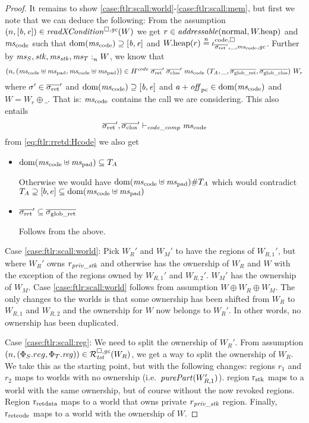 \begin{proof}
  It remains to show \ref{case:ftlr:scall:world}-\ref{case:ftlr:scall:mem}, but first we note that we can deduce the following: From the assumption $\npair{[\baddr,\eaddr]} \in \xReadCond{W}$ we get $r \in \addressable{\normal, \pwheap}$ and $\mscode$ such that $\dom(\mscode) \supseteq [\baddr,\eaddr]$ and $\pwheap(r) \nequal \codereg{\sigrets',\_,\mscode,\gc}$.
  Further by $\mathit{ms}_S,\mathit{stk},\mathit{ms}_{\mathit{stk}},\mathit{ms}_T :_{n}^{}W$, we know that
  \begin{equation}
    \npair{(\mscode\uplus\mspad,\mscode\uplus\mspad)} \in H^{\var{code}} \; \sigrets' \; \sigcloss' \; \mscode \; (\ta,\_,\gsigrets,\gsigcloss)~ W_r\label{eq:ftlr:rretd:Hcode}
  \end{equation}
  where $\sigma' \in \sigrets'$ and $\dom(\mscode) \supseteq [\baddr,\eaddr]$ and $\aaddr + \offpc \in \dom(\mscode)$ and $W = W_r \oplus \_$.
  That is: $\mscode$ contains the call we are considering.
  This also entails
  \begin{equation}
    \label{eq:ftlr:code-comp-jud}
    \sigrets',\sigcloss' \vdash_\var{code\_comp} \mscode
  \end{equation}
  from \ref{eq:ftlr:rretd:Hcode} we also get
\begin{itemize}
\item $\dom(\mscode\uplus\mspad) \subseteq \ta$

  Otherwise we would have $\dom(\mscode\uplus\mspad) \# \ta$ which would contradict $\ta\supseteq [b,e] \subseteq\dom(\mscode\uplus\mspad)$

\item $\sigrets' \subseteq \gsigrets$

  Follows from the above.
\end{itemize}


  Case \ref{case:ftlr:scall:world}: Pick $W_R'$ and $W_M'$ to have the regions of $W_{R,1}'$, but where $W_R'$ owns $r_{\mathit{priv\_stk}}$ and otherwise has the ownership of $W_R$ and $W$ with the exception of the regions owned by $W_{R,1}'$ and $W_{R,2}'$.
  $W_M'$ has the ownership of $W_M$.
  Case \ref{case:ftlr:scall:world} follows from assumption $W \oplus W_R \oplus W_M$.
  The only changes to the worlds is that some ownership has been shifted from $W_R$ to $W_{R,1}$ and $W_{R,2}$ and the ownership for $W$ now belongs to $W_R'$.
  In other words, no ownership has been duplicated.

  Case \ref{case:ftlr:scall:reg}: We need to split the ownership of $W_R'$.
  From assumption $\npair[n]{(\Phi_S.reg,\Phi_T.\reg)} \in \lrrg{\trust}(W_R)$, we get a way to split the ownership of $W_R$.
  We take this as the starting point, but with the following changes: regions $r_1$ and $r_2$ maps to worlds with no ownership (i.e.\ $\purePart{W_{R,1}'}$).
  region $\mathrm{r}_\mathrm{stk}$ maps to a world with the same ownership, but of course without the now revoked regions.
  Region $\mathrm{r}_\mathrm{ret data}$ maps to a world that owns private $r_{\mathit{priv\_stk}}$ region.
  Finally, $\mathrm{r}_\mathrm{ret code}$ maps to a world with the ownership of $W$.


\end{proof}

